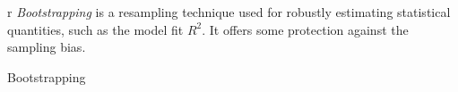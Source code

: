 \documentclass{article}
\begin{document}
\begin{floatbox}{r}{}
  \textit{Bootstrapping} is a resampling technique used 
  for robustly estimating statistical quantities, such as 
  the model fit $R^2$. It offers some protection against 
  the sampling bias.
  \caption{Bootstrapping}
\end{floatbox}
\end{document}
